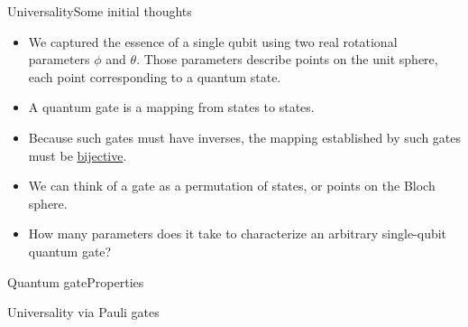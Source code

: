 
\begin{frame}{Universality}{Some initial thoughts}

\begin{itemize}[<+->]
    \item We captured the essence of a single qubit using two real rotational parameters $\phi$ and $\theta$.  Those parameters describe points on the unit sphere, each point corresponding to a quantum state.
    \item A quantum gate is a mapping from states to states.
    \item Because such gates must have inverses, the mapping established by such gates must be \href{https://en.wikipedia.org/wiki/Bijection}{bijective}.
    \item We can think of a gate as a permutation of states, or points on the Bloch sphere.
    \item How many parameters does it take to characterize an arbitrary single-qubit quantum gate?
\end{itemize}

    
\end{frame}

\begin{frame}{Quantum gate}{Properties}

\BigSkip{}
    
\end{frame}

\begin{frame}{Universality via Pauli gates}
    
\end{frame}